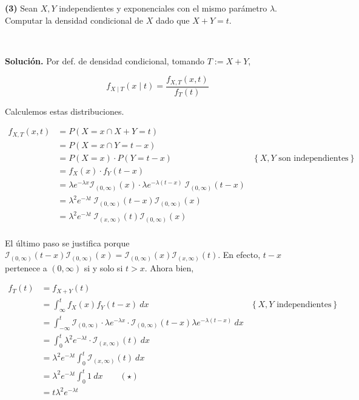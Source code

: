 \documentclass[a4paper, 12pt]{article}
\begin{document}
\pagebreak

\begin{myframe}
\textbf{(3)} Sean $X, Y$ independientes y exponenciales con el mismo parámetro
$\lambda$. Computar la densidad
condicional de $X$ dado que $X + Y = t$.
\end{myframe}

~

\textbf{Solución.} Por def. de densidad condicional, tomando $T := X + Y$,

  \begin{equation*}
    f_{X \mid T}(x\mid t) = \frac{f_{X, T}(x, t)}{f_T(t)} 
  \end{equation*}

Calculemos estas distribuciones.

\begin{align*}
  f_{X, T}(x, t) 
  &= P(X = x \cap X + Y = t) \\ 
  &= P(X = x \cap Y = t - x) \\ 
  &=P(X = x) \cdot P(Y = t - x) &\left\{ X, Y \text{ son independientes}
  \right\} \\ 
  &= f_X(x) \cdot f_Y(t - x) \\ 
  &= \lambda e^{-\lambda x} \mathcal{I}_{(0, \infty)}(x) \cdot \lambda e^{-\lambda(t - x)} ~ \mathcal{I}_{(0,
  \infty)}(t-x)\\ 
  &= \lambda^2e^{-\lambda t} ~ \mathcal{I}_{(0, \infty)}(t-x) \mathcal{I}_{(0,
  \infty)}(x) \\ 
  &= \lambda^2e^{-\lambda t} ~ \mathcal{I}_{(x, \infty)}(t) \mathcal{I}_{(0,
  \infty)}(x) \\ 
\end{align*}

El último paso se justifica porque $\mathcal{I}_{(0, \infty)}(t-x)\mathcal{I}_{(0,
\infty)}(x) = \mathcal{I}_{(0, \infty)}(x) \mathcal{I}_{(x, \infty)}(t)$. En
efecto, $t - x$ pertenece a $(0, \infty)$ si y solo si $t > x$. Ahora bien,

\begin{align*}
  f_T(t) 
  &= f_{X+Y}(t) \\ 
  &= \int_{\infty}^t f_X(x) f_Y(t - x) ~ dx &\left\{ X, Y \text{ independientes}
  \right\} \\ 
  &= \int_{-\infty}^t \mathcal{I}_{(0, \infty)} \cdot \lambda e^{-\lambda x}
  \cdot \mathcal{I}_{(0, \infty)}(t-x) \lambda
  e^{-\lambda(t - x)} ~ dx \\ 
  &=\int_0^t \lambda^2 e^{-\lambda t} \cdot 
  \mathcal{I}_{(x, \infty)}(t) ~ dx \\ 
  &=\lambda^2 e^{-\lambda  t} \int_0^t \mathcal{I}_{(x, \infty)}(t)~ dx \\ 
  &=\lambda^2 e^{-\lambda  t} \int_0^t 1 ~ dx \qquad (\star)\\ 
  &=t\lambda^2 e^{-\lambda  t} 
\end{align*}
\end{document}

